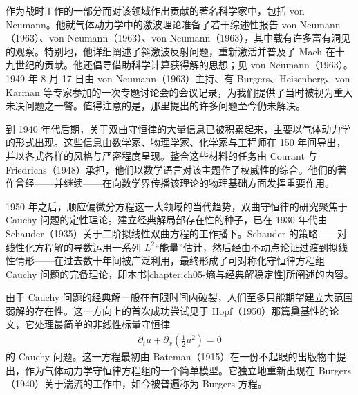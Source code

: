 \documentclass[../../main.tex]{subfiles}
\begin{document}
作为战时工作的一部分而对该领域作出贡献的著名科学家中，包括 von Neumann。他就气体动力学中的激波理论准备了若干综述性报告 von Neumann（1963）、von Neumann（1963）、von Neumann（1963），其中载有许多富有洞见的观察。特别地，他详细阐述了斜激波反射问题，重新激活并普及了 Mach 在十九世纪的贡献。他还倡导借助科学计算获得解的思想；见 von Neumann（1963）。1949 年 8 月 17 日由 von Neumann（1963）主持、有 Burgers、Heisenberg、von Karman 等专家参加的一次专题讨论会的会议记录，为我们提供了当时被视为重大未决问题之一瞥。值得注意的是，那里提出的许多问题至今仍未解决。

到 1940 年代后期，关于双曲守恒律的大量信息已被积累起来，主要以气体动力学的形式出现。这些信息由数学家、物理学家、化学家与工程师在 150 年间导出，并以各式各样的风格与严密程度呈现。整合这些材料的任务由 Courant 与 Friedrichs（1948）承担，他们以数学语言对该主题作了权威性的综合。他们的著作曾经——并继续——在向数学界传播该理论的物理基础方面发挥重要作用。

1950 年之后，顺应偏微分方程这一大领域的当代趋势，双曲守恒律的研究聚焦于 Cauchy 问题的定性理论。建立经典解局部存在性的种子，已在 1930 年代由 Schauder（1935）关于二阶拟线性双曲方程的工作播下。Schauder 的策略——对线性化方程解的导数运用一系列 $L^{2}$“能量”估计，然后经由不动点论证过渡到拟线性情形——在过去数十年间被广泛利用，最终形成了可对称化守恒律方程组 Cauchy 问题的完备理论，即本书\cref{chapter:ch05-熵与经典解稳定性}所阐述的内容。

由于 Cauchy 问题的经典解一般在有限时间内破裂，人们至多只能期望建立大范围弱解的存在性。这一方向上的首次成功尝试见于 Hopf（1950）那篇奠基性的论文，它处理最简单的非线性标量守恒律
\begin{align}
\partial_t u+\partial_x\left(\frac{1}{2}u^{2}\right)=0\label{align:front-burgers}
\end{align}
的 Cauchy 问题。这一方程最初由 Bateman（1915）在一份不起眼的出版物中提出，作为气体动力学守恒律方程组的一个简单模型。它独立地重新出现在 Burgers（1940）关于湍流的工作中，如今被普遍称为 Burgers 方程。
\end{document}
